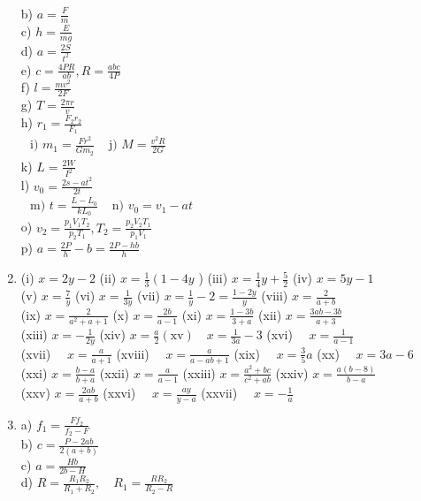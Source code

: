 \documentclass[10pt]{article}
\begin{document}
\begin{enumerate}
b) \(a=\frac{F}{m}\)\\
c) \(h=\frac{E}{m g}\)\\
d) \(a=\frac{2 S}{t^{2}}\)\\
e) \(c=\frac{4 P R}{a b}, R=\frac{a b c}{4 P}\)\\
f) \(l=\frac{m v^{2}}{2 F}\)\\
g) \(T=\frac{2 \pi r}{v}\)\\
h) \(r_{1}=\frac{F_{2} r_{2}}{F_{1}}\)\\
\(\begin{array}{ll}\text { i) } m_{1}=\frac{F r^{2}}{G m_{2}} & \text { j) } M=\frac{v^{2} R}{2 G}\end{array}\)\\
k) \(L=\frac{2 W}{I^{2}}\)\\
l) \(v_{0}=\frac{2 s-a t^{2}}{2 t}\)\\
\(\begin{array}{ll}\text { m) } t=\frac{L-L_{0}}{k L_{0}} & \text { n) } v_{0}=v_{1}-a t\end{array}\)\\
o) \(v_{2}=\frac{p_{1} V_{1} T_{2}}{p_{2} T_{1}}, T_{2}=\frac{p_{2} V_{2} T_{1}}{p_{1} V_{1}}\)\\
p) \(a=\frac{2 P}{h}-b=\frac{2 P-h b}{h}\)
  \item (i) \(x=2 y-2\) (ii) \(x=\frac{1}{3}\left(1-4 y\right.\) ) (iii) \(x=\frac{1}{4} y+\frac{5}{2}\) (iv) \(x=5 y-1\)\\
(v) \(x=\frac{7}{y}\) (vi) \(x=\frac{1}{3 y}\) (vii) \(x=\frac{1}{y}-2=\frac{1-2 y}{y}\) (viii) \(x=\frac{2}{a+b}\)\\
(ix) \(x=\frac{2}{a^{2}+a+1}\) (x) \(x=\frac{2 b}{a-1}\) (xi) \(x=\frac{1-3 b}{3+a}\) (xii) \(x=\frac{3 a b-3 b}{a+3}\)\\
(xiii) \(x=-\frac{1}{2 y}\) (xiv) \(x=\frac{a}{2}(\mathrm{xv}) \quad x=\frac{1}{3 a}-3\) (xvi) \(\quad x=\frac{1}{a-1}\)\\
(xvii) \(\quad x=\frac{a}{a+1}\) (xviii) \(\quad x=\frac{a}{a-a b+1}\) (xix) \(\quad x=\frac{3}{5} a\) (xx) \(\quad x=3 a-6\)\\
(xxi) \(x=\frac{b-a}{b+a}\) (xxii) \(x=\frac{a}{a-1}\) (xxiii) \(x=\frac{a^{2}+b c}{c^{2}+a b}\) (xxiv) \(x=\frac{a(b-8)}{b-a}\)\\
(xxv) \(x=\frac{2 a b}{a+b}\) (xxvi) \(\quad x=\frac{a y}{y-a}\) (xxvii) \(\quad x=-\frac{1}{a}\)
  \item a) \(f_{1}=\frac{F f_{2}}{f_{2}-F}\)\\
b) \(c=\frac{P-2 a b}{2(a+b)}\)\\
c) \(a=\frac{H b}{2 b-H}\)\\
d) \(R=\frac{R_{1} R_{2}}{R_{1}+R_{2}}, \quad R_{1}=\frac{R R_{2}}{R_{2}-R}\)
\end{enumerate}
\end{document}
